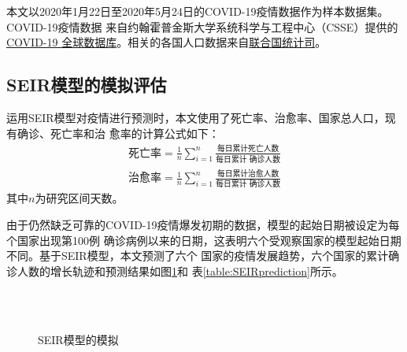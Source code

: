 \documentclass[lang=cn,11pt,a4paper,cite=authoryear]{elegantpaper}
\begin{document}
本文以2020年1月22日至2020年5月24日的COVID-19疫情数据作为样本数据集。COVID-19疫情数据
来自约翰霍普金斯大学系统科学与工程中心（CSSE）提供的\href{https://github.com/CSSEGISandData/COVID-19}{COVID-19
全球数据库}。相关的各国人口数据来自\href{https://unstats.un.org}{联合国统计司}。

\subsection{SEIR模型的模拟评估}

运用SEIR模型对疫情进行预测时，本文使用了死亡率、治愈率、国家总人口，现有确诊、死亡率和治
愈率的计算公式如下：
\begin{gather}
\text{死亡率}=\frac{1}{n}\sum_{i=1}^n\frac{\text{每日累计死亡人数}}{\text{每日累计
确诊人数}} \\
\text{治愈率}=\frac{1}{n}\sum_{i=1}^n\frac{\text{每日累计治愈人数}}{\text{每日累计
确诊人数}}
\end{gather}
其中$n$为研究区间天数。

由于仍然缺乏可靠的COVID-19疫情爆发初期的数据，模型的起始日期被设定为每个国家出现第100例
确诊病例以来的日期，这表明六个受观察国家的模型起始日期不同。基于SEIR模型，本文预测了六个
国家的疫情发展趋势，六个国家的累计确诊人数的增长轨迹和预测结果如图\ref{fig:SEIRfit}和
表\ref{table:SEIRprediction}所示。

\begin{figure}[htp]
	\centering
	\\
    \\
	\caption{SEIR模型的模拟}
	\label{fig:SEIRfit}
\end{figure}
\end{document}
